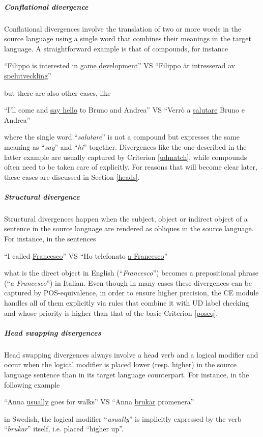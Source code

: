 \subparagraph*{Conflational divergence} \label{confl}
Conflational divergences involve the translation of two or more words in the source language using a single word that combines their meanings in the target language. A straightforward example is that of compounds, for instance
\begin{example} 
 ``Filippo is interested in \underline{game development}'' VS ``Filippo är intresserad av \underline{spelutveckling}''
\end{example}
but there are also other cases, like
\begin{example} 
 ``I'll come and \underline{say hello} to Bruno and Andrea'' VS ``Verrò a \underline{salutare} Bruno e Andrea''
\end{example} 
where the single word ``\textit{salutare}'' is not a compound but expresses the same meaning as ``\textit{say}'' and ``\textit{hi}'' together. \smallskip
Divergences like the one described in the latter example are usually captured by Criterion \ref{udmatch}, while compounds often need to be taken care of explicitly. For reasons that will become clear later, these cases are discussed in Section \ref{heads}.

\subparagraph*{Structural divergence}
Structural divergences happen when the subject, object or indirect object of a sentence in the source language are rendered as obliques in the source language. For instance, in the sentences
\begin{example}
 ``I called \underline{Francesco}'' VS ``Ho telefonato \underline{a Francesco}''
\end{example}
what is the direct object in English (``\textit{Francesco}'') becomes a prepositional phrase (``\textit{a Francesco}'') in Italian. 
Even though in many cases these divergences can be captured by POS-equivalence, in order to ensure higher precision, the CE module handles all of them explicitly via rules that combine it with UD label checking and whose priority is higher than that of the basic Criterion \ref{poseq}.

\subparagraph*{Head swapping divergences}
Head swapping divergences always involve a head verb and a logical modifier and occur when the logical modifier is placed lower (resp. higher) in the source language sentence than in its target language counterpart. For instance, in the following example
\begin{example}
 ``Anna \underline{usually} goes for walks'' VS ``Anna \underline{brukar} promenera''
\end{example} 
in Swedish, the logical modifier ``\textit{usually}'' is implicitly expressed by the verb ``\textit{brukar}'' itself, i.e. placed ``higher up''. \smallskip

